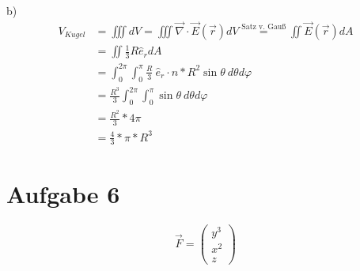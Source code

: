 \documentclass[a4paper]{article}
\begin{document}
\par{b)}
\begin{align*}
	V_{Kugel} 
	&= \iiint dV = \iiint \vec{\nabla} \cdot \vec{E}(\vec{r})dV \overset{\text{Satz v. Gauß}}{=}
	\iint \vec{E}(\vec{r})dA \\
	&= \iint \frac{1}{3} R \hat{e}_r dA \\
	&= \int_0^{2\pi} \int_0^\pi \frac{R}{3} \ \hat{e}_r \cdot \hat{n} * R^2\sin\theta \ d\theta d\varphi \\
	&= \frac{R^3}{3} \int_0^{2\pi} \int_0^\pi \sin\theta \ d\theta d\varphi \\
	&= \frac{R^2}{3} * 4\pi \\
	&= \frac{4}{3} * \pi * R^3
\end{align*}

\newpage
\section*{Aufgabe 6}
\[
	\vec F = \begin{pmatrix} y^3 \\ x^2 \\ z \end{pmatrix}
\]
\end{document}
